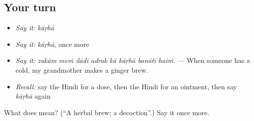 \subsection*{Your turn}
\begin{itemize}
\raggedright
  \item \emph{Say it:} \emph{kāṛhā}
  \item \emph{Say it:} \emph{kāṛhā}, once more
  \item \emph{Say it:} \emph{zukām meṁ dādī adrak kā kāṛhā banātī haiṁ.} — When someone has a cold, my grandmother makes a ginger brew.
  \item \emph{Recall:} say the Hindi for a dose, then the Hindi for an ointment, then say \emph{kāṛhā} again
\end{itemize}

\begin{tcolorbox}[breakable,colback=teal!4,colframe=teal!35!black,title={Before you move on}]
What does  mean? (\textquotedblleft{}A herbal brew; a decoction\textquotedblright{}.) Say it once more.
\end{tcolorbox}
